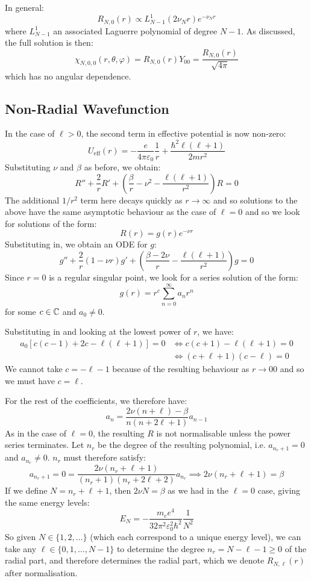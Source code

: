 \documentclass[../main.tex]{subfiles}
\begin{document}
In general:
\[
  R_{N, 0}(r) \propto L^1_{N - 1}(2\nu_N r) e^{-\nu_N r}
\]
where $L^{1}_{N - 1}$ an associated Laguerre polynomial of degree $N - 1$.
As discussed, the full solution is then:
\[
  \chi_{N, 0, 0}(r, \theta, \varphi) = R_{N, 0}(r) Y_{0 0} = \frac{R_{N, 0}(r)}{\sqrt{4\pi}}
\]
which has no angular dependence.
\subsection{Non-Radial Wavefunction}
In the case of $\ell > 0$, the second term in effective potential is now non-zero:
\[
  U_{\text{eff}}(r) = - \frac{e}{4\pi \varepsilon_0}\frac{1}{r} + \frac{\hbar^2\ell(\ell + 1)}{2mr^2}
\]
Substituting $\nu$ and $\beta$ as before, we obtain:
\[
  R'' + \frac{2}{r}R' + \left(\frac{\beta}{r} - \nu^2 - \frac{\ell(\ell + 1)}{r^2}\right)R = 0
\]
The additional $1/r^2$ term here decays quickly as $r \to \infty$ and so solutions to the above have the same asymptotic behaviour as the case of $\ell = 0$ and so we look for solutions of the form:
\[
  R(r) = g(r) e^{-\nu r}
\]
Substituting in, we obtain an ODE for $g$:
\[
  g'' + \frac{2}{r}(1 - \nu r) g' + \left(\frac{\beta - 2\nu}{r} - \frac{\ell(\ell + 1)}{r^2}\right)g = 0
\]
Since $r = 0$ is a regular singular point, we look for a series solution of the form:
\[
  g(r) = r^{c} \sum_{n = 0}^{\infty} a_n r^{n}
\]
for some $c \in \mathbb{C}$ and $a_0 \neq 0$.

Substituting in and looking at the lowest power of $r$, we have:
\begin{align*}
  a_0 [c(c - 1) + 2c - \ell(\ell + 1)] = 0 &\iff c(c + 1) - \ell(\ell + 1) = 0 \\
                                           &\iff (c + \ell + 1)(c - \ell) = 0
\end{align*}
We cannot take $c = -\ell - 1$ because of the resulting behaviour as $r \to 0 0$ and so we must have $c = \ell$.

For the rest of the coefficients, we therefore have:
\[
  a_n = \frac{2\nu(n + \ell) - \beta}{n(n + 2\ell + 1)} a_{n - 1}
\]
As in the case of $\ell = 0$, the resulting $R$ is not normalisable unless the power series terminates.
Let $n_r$ be the degree of the resulting polynomial, i.e. $a_{n_r + 1} = 0$ and $a_{n_r} \neq 0$.
$n_r$ must therefore satisfy:
\[
  a_{n_r + 1} = 0 = \frac{2\nu(n_r + \ell + 1)}{(n_r + 1)(n_r + 2\ell + 2)} a_{n_r} \implies 2\nu(n_r + \ell + 1) = \beta
\]
If we define $N = n_r + \ell + 1$, then $2\nu N = \beta$ as we had in the $\ell = 0$ case, giving the same energy levels:
\[
  E_N = - \frac{m_e e^{4}}{32 \pi^2 \varepsilon^2_0 \hbar^2} \frac{1}{N^2}
\]
So given $N \in \{1, 2, \ldots\}$ (which each correspond to a unique energy level), we can take any $\ell \in \{0, 1, \ldots, N - 1\}$ to determine the degree $n_r = N - \ell - 1 \geq 0$ of the radial part, and therefore determines the radial part, which we denote $R_{N, \ell}(r)$ after normalisation.
\end{document}
